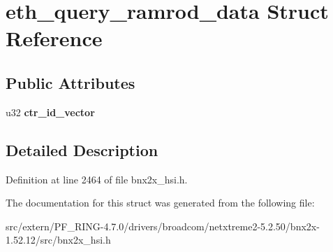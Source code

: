 \hypertarget{structeth__query__ramrod__data}{
\section{eth\_\-query\_\-ramrod\_\-data Struct Reference}
\label{structeth__query__ramrod__data}
}
\subsection*{Public Attributes}
\begin{DoxyCompactItemize}
\item 
\hypertarget{structeth__query__ramrod__data_a5ef10abf494d71fef111f8af018ba7f8}{
u32 {\bfseries ctr\_\-id\_\-vector}}
\label{structeth__query__ramrod__data_a5ef10abf494d71fef111f8af018ba7f8}

\end{DoxyCompactItemize}


\subsection{Detailed Description}


Definition at line 2464 of file bnx2x\_\-hsi.h.



The documentation for this struct was generated from the following file:\begin{DoxyCompactItemize}
\item 
src/extern/PF\_\-RING-\/4.7.0/drivers/broadcom/netxtreme2-\/5.2.50/bnx2x-\/1.52.12/src/bnx2x\_\-hsi.h\end{DoxyCompactItemize}
